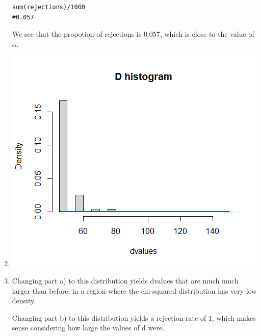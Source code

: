 \documentclass{article}
\begin{document}
\begin{enumerate}
\begin{lstlisting}
sum(rejections)/1000
#0.057
	\end{lstlisting}
	We see that the propotion of rejections is $0.057$,
	which is close to the value of $\alpha$.
	\newpage
	\item \includegraphics[scale=0.7]{partc.png}
	\item 
	Changing part a) to this distribution yields dvalues that are much much 
	larger than before, in a region where the chi-squared distribution has 
	very low density.

	Changing part b) to this distribution yields a rejection rate of $1$,
	which makes sense considering how large the values of d were.
\end{enumerate}
\end{document}
